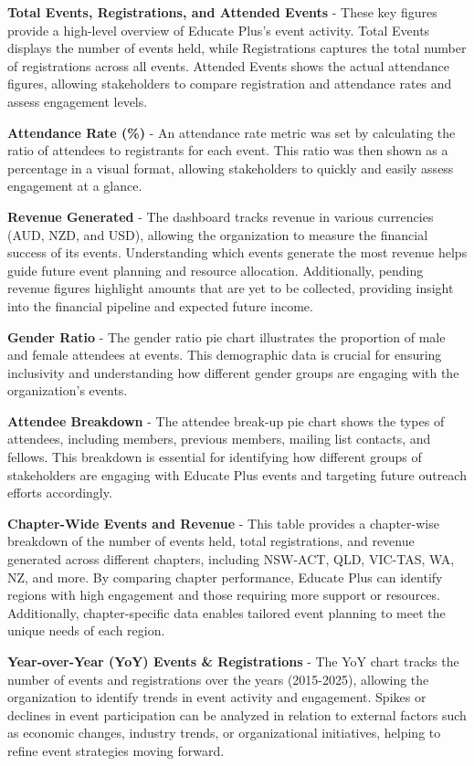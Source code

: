 \documentclass[11pt,a4paper,]{article}
\begin{document}
\textbf{Total Events, Registrations, and Attended Events} - These key figures provide a high-level overview of Educate Plus's event activity. Total Events displays the number of events held, while Registrations captures the total number of registrations across all events. Attended Events shows the actual attendance figures, allowing stakeholders to compare registration and attendance rates and assess engagement levels.

\textbf{Attendance Rate (\%)} - An attendance rate metric was set by calculating the ratio of attendees to registrants for each event. This ratio was then shown as a percentage in a visual format, allowing stakeholders to quickly and easily assess engagement at a glance.

\textbf{Revenue Generated} - The dashboard tracks revenue in various currencies (AUD, NZD, and USD), allowing the organization to measure the financial success of its events. Understanding which events generate the most revenue helps guide future event planning and resource allocation. Additionally, pending revenue figures highlight amounts that are yet to be collected, providing insight into the financial pipeline and expected future income.

\textbf{Gender Ratio} - The gender ratio pie chart illustrates the proportion of male and female attendees at events. This demographic data is crucial for ensuring inclusivity and understanding how different gender groups are engaging with the organization's events.

\textbf{Attendee Breakdown} - The attendee break-up pie chart shows the types of attendees, including members, previous members, mailing list contacts, and fellows. This breakdown is essential for identifying how different groups of stakeholders are engaging with Educate Plus events and targeting future outreach efforts accordingly.

\textbf{Chapter-Wide Events and Revenue} - This table provides a chapter-wise breakdown of the number of events held, total registrations, and revenue generated across different chapters, including NSW-ACT, QLD, VIC-TAS, WA, NZ, and more. By comparing chapter performance, Educate Plus can identify regions with high engagement and those requiring more support or resources. Additionally, chapter-specific data enables tailored event planning to meet the unique needs of each region.

\textbf{Year-over-Year (YoY) Events \& Registrations} -
The YoY chart tracks the number of events and registrations over the years (2015-2025), allowing the organization to identify trends in event activity and engagement. Spikes or declines in event participation can be analyzed in relation to external factors such as economic changes, industry trends, or organizational initiatives, helping to refine event strategies moving forward.
\end{document}
